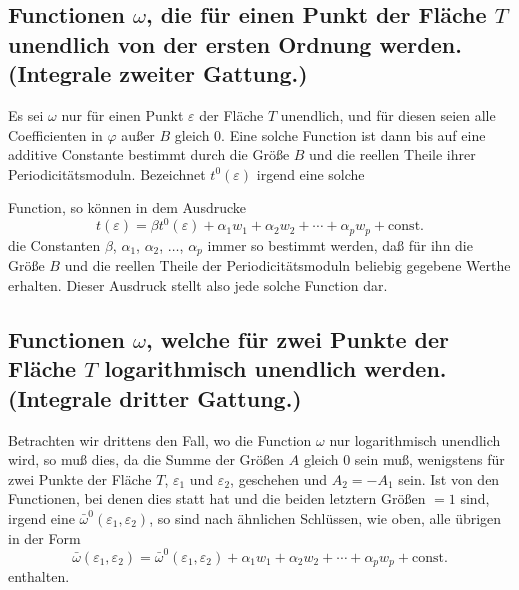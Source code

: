 \documentclass{article}
\begin{document}
\subsection*{Functionen $\omega$, die für einen Punkt der Fläche $T$ unendlich von der ersten Ordnung werden. (Integrale zweiter Gattung.)}

Es sei $\omega$ nur für einen Punkt $\varepsilon$ der Fläche $T$ unendlich, und für diesen seien alle Coefficienten in $\varphi$ außer $B$ gleich 0. Eine solche Function ist dann bis auf eine additive Constante bestimmt durch die Größe $B$ und die reellen Theile ihrer Periodicitätsmoduln. Bezeichnet $t^{0}(\varepsilon)$ irgend eine solche

Function, so können in dem Ausdrucke
\[ t(\varepsilon) = \beta t^{0}(\varepsilon) + \alpha_{1} w_{1} + \alpha_{2} w_{2} + \cdots + \alpha_{p} w_{p} + \text{const.} \]
die Constanten $\beta$, $\alpha_{1}$, $\alpha_{2}$, $\ldots$, $\alpha_{p}$ immer so bestimmt werden, daß für ihn die Größe $B$ und die reellen Theile der Periodicitätsmoduln beliebig gegebene Werthe erhalten. Dieser Ausdruck stellt also jede solche Function dar.

\subsection*{Functionen $\omega$, welche für zwei Punkte der Fläche $T$ logarithmisch unendlich werden. (Integrale dritter Gattung.)}

Betrachten wir drittens den Fall, wo die Function $\omega$ nur logarithmisch unendlich wird, so muß dies, da die Summe der Größen $A$ gleich 0 sein muß, wenigstens für zwei Punkte der Fläche $T$, $\varepsilon_{1}$ und $\varepsilon_{2}$, geschehen und $A_{2} = -A_{1}$ sein. Ist von den Functionen, bei denen dies statt hat und die beiden letztern Größen $= 1$ sind, irgend eine $\bar{\omega}^{0}(\varepsilon_{1}, \varepsilon_{2})$, so sind nach ähnlichen Schlüssen, wie oben, alle übrigen in der Form
\[ \bar{\omega}(\varepsilon_{1}, \varepsilon_{2}) = \bar{\omega}^{0}(\varepsilon_{1}, \varepsilon_{2}) + \alpha_{1} w_{1} + \alpha_{2} w_{2} + \cdots + \alpha_{p} w_{p} + \text{const.} \]
enthalten.
\end{document}
